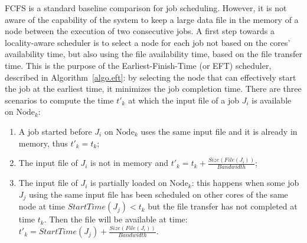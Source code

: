 \documentclass[sigconf,review,anonymous]{acmart}
\newcommand{\Node}[1]{\ensuremath{\mathrm{Node}_{#1}}\xspace}
\newcommand{\file}{\ensuremath{\mathit{File}}\xspace}
\newcommand{\size}{\ensuremath{\mathit{Size}}\xspace}
\newcommand{\bandwidth}{\mathit{Bandwidth}\xspace}
\newcommand{\start}{\mathit{StartTime}\xspace}
\begin{document}
FCFS is a standard baseline comparison
for job scheduling. However, it is not aware of the capability of the
system to keep a large data file in the memory of a node between the execution of
two consecutive jobs.
A first step towards a locality-aware scheduler
is to select a node for each job not based on the cores' availability
time, but also using the file availability time, based on the file
transfer time. This is the purpose of the Earliest-Finish-Time (or
EFT) scheduler, described in Algorithm~\ref{algo.eft}: by selecting
the node that can effectively start the job at the earliest time, it
minimizes the job completion time. There are three scenarios to compute the
time $t'_k$ at which the input file of a job $J_i$ is available on
\Node{k}:
\begin{enumerate}
\item A job started before $J_i$ on \Node{k} uses the same input
  file and it is already in memory, thus $t'_k=t_k$;
\item The input file of $J_i$ is not in memory and
  $t'_k=t_k+\frac{\size(\file(J_i))}{\bandwidth}$;
\item The input file of $J_i$ is partially loaded on \Node{k}: this
  happens when some
  job $J_j$ using the same input file has been scheduled on other cores of
  the same node at time $\start(J_j)<t_k$ but the file transfer has not
  completed at time $t_k$. Then the file will be available at time:
  $t'_k = \start(J_j)+\frac{\size(\file(J_i))}{\bandwidth}.$
\end{enumerate}


		
\end{document}
